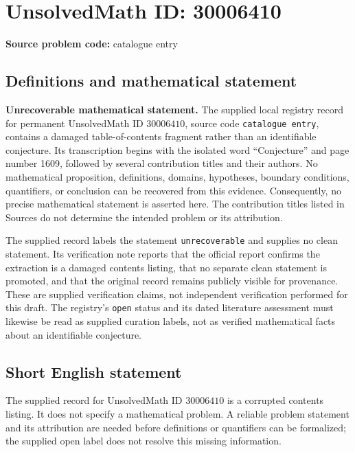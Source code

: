 \documentclass[11pt]{article}
\begin{document}
\section*{UnsolvedMath ID: 30006410}
\textbf{Source problem code:} catalogue entry
\subsection{Definitions and mathematical statement}
\textbf{Unrecoverable mathematical statement.} The supplied local registry record for permanent UnsolvedMath ID \(30006410\), source code \texttt{catalogue entry}, contains a damaged table-of-contents fragment rather than an identifiable conjecture. Its transcription begins with the isolated word ``Conjecture'' and page number 1609, followed by several contribution titles and their authors. No mathematical proposition, definitions, domains, hypotheses, boundary conditions, quantifiers, or conclusion can be recovered from this evidence. Consequently, no precise mathematical statement is asserted here. The contribution titles listed in Sources do not determine the intended problem or its attribution.

The supplied record labels the statement \texttt{unrecoverable} and supplies no clean statement. Its verification note reports that the official report confirms the extraction is a damaged contents listing, that no separate clean statement is promoted, and that the original record remains publicly visible for provenance. These are supplied verification claims, not independent verification performed for this draft. The registry's \texttt{open} status and its dated literature assessment must likewise be read as supplied curation labels, not as verified mathematical facts about an identifiable conjecture.
\subsection{Short English statement}
The supplied record for UnsolvedMath ID \(30006410\) is a corrupted contents listing. It does not specify a mathematical problem. A reliable problem statement and its attribution are needed before definitions or quantifiers can be formalized; the supplied open label does not resolve this missing information.
\end{document}
